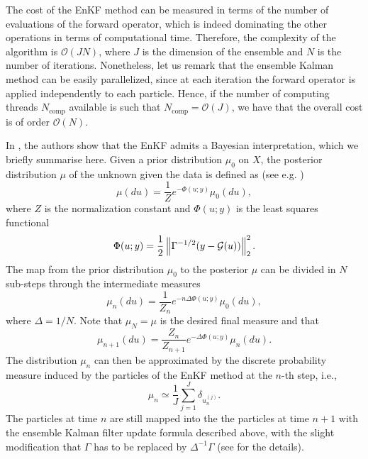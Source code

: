 \documentclass[10pt]{article}
\begin{document}
\begin{remark} The cost of the EnKF method can be measured in terms of the number of evaluations of the forward operator, which is indeed dominating the other operations in terms of computational time. Therefore, the complexity of the algorithm is $\mathcal{O}(JN)$, where $J$ is the dimension of the ensemble and $N$ is the number of iterations. Nonetheless, let us remark that the ensemble Kalman method can be easily parallelized, since at each iteration the forward operator is applied independently to each particle. Hence, if the number of computing threads $N_{\mathrm{comp}}$ available is such that $N_{\mathrm{comp}} = \mathcal O(J)$, we have that the overall cost is of order $\mathcal O(N)$.
\end{remark}

In \cite{ScS17}, the authors show that the EnKF admits a Bayesian interpretation, which we briefly summarise here. Given a prior distribution $\mu_0$ on $X$, the posterior distribution $\mu$ of the unknown given the data is defined as (see e.g. \cite{Stu10})
\begin{equation*}
\mu(du) = \frac{1}{Z} e^{- \Phi(u;y)} \mu_0(du),
\end{equation*}
where $Z$ is the normalization constant and $\Phi(u;y)$ is the least squares functional
\[ \Phi(u;y) = \frac{1}{2} \left\| \Gamma^{-1/2} (y - \mathcal{G}(u)) \right\|_2^2. \]
The map from the prior distribution $\mu_0$ to the posterior $\mu$ can be divided in $N$ sub-steps through the intermediate measures
\begin{equation*}
	\mu_n(du) = \frac{1}{Z_n} e^{- n \Delta \Phi(u;y)} \mu_0(du),
\end{equation*}
where $\Delta = 1/N$. Note that $\mu_N = \mu$ is the desired final measure and that
\begin{equation*}
	\mu_{n+1}(du) = \frac{Z_n}{Z_{n+1}} e^{-\Delta \Phi(u;y)} \mu_n(du).
\end{equation*}
The distribution $\mu_n$ can then be approximated by the discrete probability measure induced by the particles of the EnKF method at the $n$-th step, i.e.,
\begin{equation} \label{mu_delta}
\mu_n \simeq \frac{1}{J} \sum_{j=1}^J \delta_{u_{n}^{(j)}}.
\end{equation}
The particles at time $n$ are still mapped into the the particles at time $n+1$ with the ensemble Kalman filter update formula described above, with the slight modification that $\Gamma$ has to be replaced by $\Delta^{-1} \Gamma$ (see \cite{ScS17} for the details).
\end{document}

